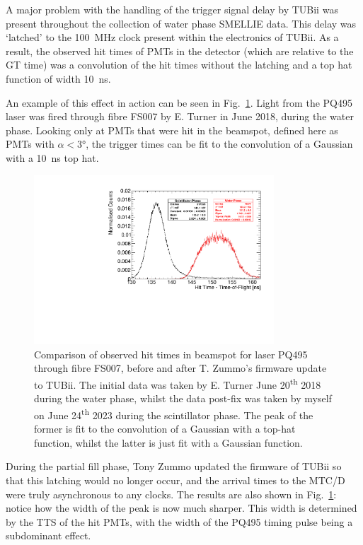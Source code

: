 A major problem with the handling of the trigger signal delay by TUBii was present throughout the collection of water phase SMELLIE data. This delay was `latched' to the \SI{100}{\MHz} clock present within the electronics of TUBii. As a result, the observed hit times of PMTs in the detector (which are relative to the GT time) was a convolution of the hit times without the latching and a top hat function of width \SI{10}{\ns}.

An example of this effect in action can be seen in Fig.~\ref{fig:smellie_beam_tres_tubii_comparison}. Light from the PQ495 laser was fired through fibre FS007 by E. Turner in June 2018, during the water phase. Looking only at PMTs that were hit in the beamspot, defined here as PMTs with $\alpha<\ang{3}$, the trigger times can be fit to the convolution of a Gaussian with a \SI{10}{\ns} top hat.

\begin{figure}
    \centering
    \includegraphics[width=0.8\textwidth]{3_SMELLIEHardware/images/time_plots_comparison_114018_vs_302634_FS007_nice.pdf}
    \caption[Comparison of observed hit times in beamspot before and after TUBii firmware update]
    {Comparison of observed hit times in beamspot for laser PQ495 through fibre FS007, before and after T. Zummo's firmware update to TUBii. The initial data was taken by E. Turner June 20\textsuperscript{th} 2018 during the water phase, whilst the data post-fix was taken by myself on June 24\textsuperscript{th} 2023 during the scintillator phase. The peak of the former is fit to the convolution of a Gaussian with a top-hat function, whilst the latter is just fit with a Gaussian function.}
    \label{fig:smellie_beam_tres_tubii_comparison}
\end{figure}

During the partial fill phase, Tony Zummo updated the firmware of TUBii so that this latching would no longer occur, and the arrival times to the MTC/D were truly asynchronous to any clocks. The results are also shown in Fig.~\ref{fig:smellie_beam_tres_tubii_comparison}: notice how the width of the peak is now much sharper. This width is determined by the TTS of the hit PMTs, with the width of the PQ495 timing pulse being a subdominant effect.

